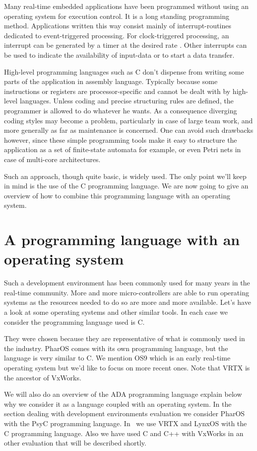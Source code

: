 \documentclass[10pt]{report}
\begin{document}
Many real-time embedded applications have been programmed without
using an operating system for execution control. It is a long
standing programming method. Applications written this way
consist mainly of interrupt-routines dedicated to event-triggered
processing. For clock-triggered processing, an interrupt can be
generated by a timer at the desired rate . Other interrupts can
be used to indicate the availability of input-data or to start a
data transfer.

High-level programming languages such as C don't dispense from
writing some parts of the application in assembly language.
Typically because some instructions or registers are
processor-specific and cannot be dealt with by high-level
languages. Unless coding and precise structuring rules are
defined, the programmer is allowed to do whatever he wants. As a
consequence diverging coding styles may become a problem,
particularly in case of large team work, and more generally as
far as maintenance is concerned. One can avoid such drawbacks
however, since these simple programming tools make it easy to
structure the application as a set of finite-state automata for
example, or even Petri nets in case of multi-core architectures.

Such an approach, though quite basic, is widely used. The only
point we'll keep in mind is the use of the C programming
language. We are now going to give an overview of how to combine
this programming language with an operating system.


\section{A programming language with an operating system}

Such a development environment has been commonly used for many
years in the real-time community. More and more micro-controllers
are able to run operating systems as the resources needed to do
so are more and more available. Let's have a look at some
operating systems and other similar tools. In each case we
consider the programming language used is C.

They were chosen because they are representative of what is
commonly used in the industry. PharOS comes with its own
programming language, but the language is very similar to C. We
mention OS9 which is an early real-time operating system but we'd
like to focus on more recent ones. Note that VRTX is the ancestor
of VxWorks.

We will also do an overview of the ADA programming language
explain below why we consider it as a language coupled with an
operating system. In the section dealing with development
environments evaluation we consider PharOS with the PsyC
programming language. In~\cite{Delchini:95} we use VRTX and LynxOS
with the C programming language. Also we have used C and C++ with
VxWorks in an other evaluation that will be described shortly.
\end{document}
